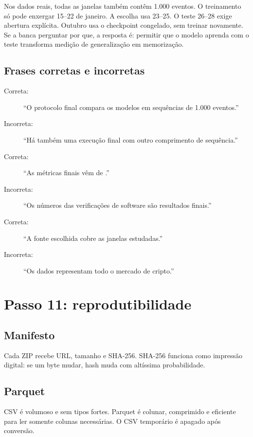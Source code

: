 \documentclass[12pt,a4paper,openany]{report}
\begin{document}
Nos dados reais, todas as janelas também contêm 1.000 eventos. O treinamento só pode
enxergar 15--22 de janeiro. A escolha usa 23--25. O teste 26--28 exige abertura
explícita. Outubro usa o checkpoint congelado, sem treinar novamente. Se a banca
perguntar por que, a resposta é: permitir que o modelo aprenda com o teste transforma
medição de generalização em memorização.

\section{Frases corretas e incorretas}

\begin{description}
  \item[Correta:] ``O protocolo final compara os modelos em sequências de 1.000 eventos.''
  \item[Incorreta:] ``Há também uma execução final com outro comprimento de sequência.''
  \item[Correta:] ``As métricas finais vêm de
  .''
  \item[Incorreta:] ``Os números das verificações de software são resultados finais.''
  \item[Correta:] ``A fonte escolhida cobre as janelas estudadas.''
  \item[Incorreta:] ``Os dados representam todo o mercado de cripto.''
\end{description}

\chapter{Passo 11: reprodutibilidade}

\section{Manifesto}

Cada ZIP recebe URL, tamanho e SHA-256. SHA-256 funciona como impressão digital:
se um byte mudar, hash muda com altíssima probabilidade.

\section{Parquet}

CSV é volumoso e sem tipos fortes. Parquet é colunar, comprimido e eficiente para ler
somente colunas necessárias. O CSV temporário é apagado após conversão.
\end{document}
